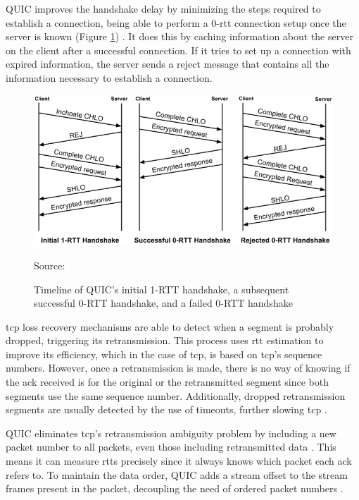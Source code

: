 QUIC improves the handshake delay by minimizing the steps required to establish a connection, being able to perform a 0-\gls{rtt} connection setup once the server is known (Figure \ref{figure:quic_handshake}) \cite{quic_protocol, rfc9000}. It does this by caching information about the server on the client after a successful connection. If it tries to set up a connection with expired information, the server sends a reject message that contains all the information necessary to establish a connection.

\begin{figure}[ht]
    \centering
    \includegraphics[width=\linewidth]{figures/ConnectionEstablishment.png}
    \caption{Timeline of QUIC’s initial 1-RTT handshake, a subsequent successful 0-RTT handshake, and a failed 0-RTT handshake}
    {Source: \cite{quic_protocol}}
    \label{figure:quic_handshake}
\end{figure}

\gls{tcp} loss recovery mechanisms are able to detect when a segment is probably dropped, triggering its retransmission. This process uses \gls{rtt} estimation to improve its efficiency, which in the case of \gls{tcp}, is based on \gls{tcp}’s sequence numbers. However, once a retransmission is made, there is no way of knowing if the \gls{ack} received is for the original or the retransmitted segment since both segments use the same sequence number. Additionally, dropped retransmission segments are usually detected by the use of timeouts, further slowing \gls{tcp} \cite{quic_protocol,rfc2988,rfc9000,tcp_timer_dont_work_well}.

QUIC eliminates \gls{tcp}’s retransmission ambiguity problem by including a new packet number to all packets, even those including retransmitted data \cite{rfc9000}. This means it can measure \gls{rtt}s precisely since it always knows which packet each \gls{ack} refers to. To maintain the data order, QUIC adds a stream offset to the stream frames present in the packet, decoupling the need of ordered packet numbers \cite{quic_protocol}.

